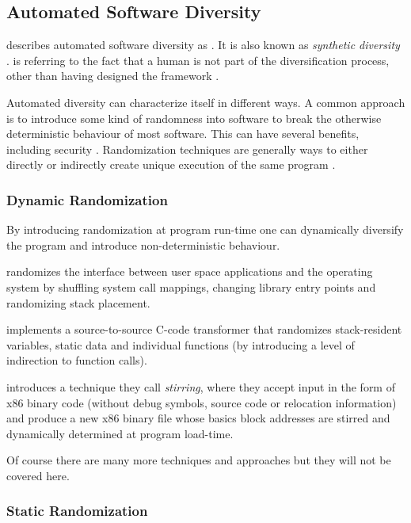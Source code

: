 \subsection{Automated Software Diversity}

\textcite{survey} describes automated software diversity as  \cite[\pno~8]{survey}. It is also
known as \textit{synthetic diversity} \cite{synthetic-diversity}.  is
referring to the fact that a human is not part of the diversification process, other than
having designed the framework \cite[Section~4]{survey}.

Automated diversity can characterize itself in different ways. A common approach is to
introduce some kind of randomness into software to break the otherwise deterministic behaviour
of most software. This can have several benefits, including security \cite{add-obfuscation}.
Randomization techniques are generally ways to either directly or indirectly create unique
execution of the same program \cite[Section~4.1]{survey}.

\subsubsection{Dynamic Randomization}

By introducing randomization at program run-time one can dynamically diversify the program
and introduce non-deterministic behaviour.

\textcite{os-randomization} randomizes the interface
between user space applications and the operating system by shuffling system call mappings,
changing library entry points and randomizing stack placement.

\textcite{mem-exploits} implements a source-to-source C-code transformer that randomizes
stack-resident variables, static data and individual functions (by introducing a level of
indirection to function calls).

\textcite{binary-stirring} introduces a technique they call \textit{stirring}, where
they accept input in the form of x86 binary code (without debug symbols, source code or
relocation information) and produce a new x86 binary file whose basics block addresses
are stirred and dynamically determined at program load-time.

Of course there are many more techniques and approaches but they will not be covered here.

\subsubsection{Static Randomization}

